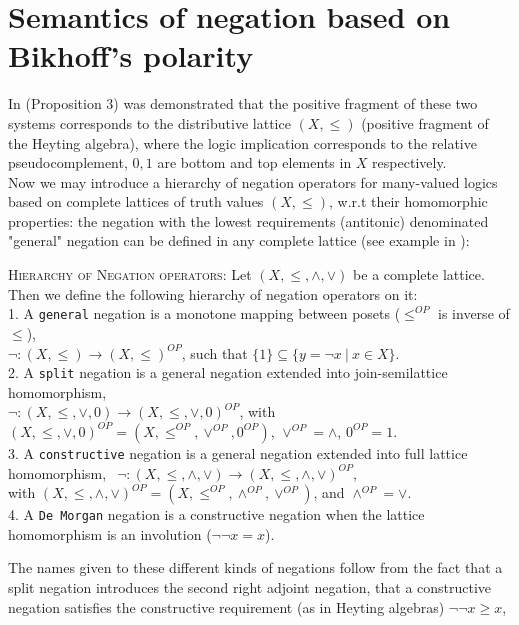 \documentclass{llncs}
\begin{document}
\section{Semantics of negation based on Bikhoff's polarity}
In \cite{Majk08dc} (Proposition 3) was demonstrated that the
positive fragment of these two systems corresponds to the
distributive lattice $(X,\leq)$ (positive fragment of the Heyting
algebra), where the logic implication corresponds to the relative
pseudocomplement, $0,1$ are bottom and top elements in $X$ respectively.\\
Now we may introduce a hierarchy of negation operators
\cite{Majk06ml} for many-valued logics based on complete lattices of
truth values $(X,\leq)$, w.r.t their homomorphic properties: the
negation with the lowest requirements (antitonic) denominated
"general" negation can be defined in any complete lattice (see
example in \cite{Majk08dc}):
\begin{definition}
\textsc{Hierarchy of Negation operators:}  \label{def:negation} Let
$(X, \leq, \wedge, \vee)$ be a complete lattice. Then we define
the following hierarchy of negation operators on it:\\
1. A \verb"general" negation is a monotone mapping between posets ($\leq^{OP}$ is inverse of $\leq$),\\
$\neg:(X,\leq) \rightarrow (X, \leq)^{OP}$, such that $\{1 \}
\subseteq \{ y = \neg x~|~ x \in X \}$.\\
2. A \verb"split" negation is a general negation extended into
join-semilattice homomorphism,\\
$\neg:(X,\leq, \vee,0) \rightarrow (X, \leq, \vee,0)^{OP}$, with
$(X, \leq, \vee,0)^{OP} = (X, \leq^{OP}, \vee^{OP},0^{OP})$,
$\vee^{OP} =
\wedge$, $0^{OP} = 1$.\\
 3. A \verb"constructive" negation is a general negation
extended into full
 lattice homomorphism,
$~~ \neg:(X,\leq, \wedge, \vee) \rightarrow (X, \leq, \wedge,
\vee)^{OP}$,\\ with $(X, \leq, \wedge, \vee)^{OP} = (X, \leq^{OP},
\wedge^{OP}, \vee^{OP}) $, and $\wedge^{OP} = \vee$.\\
4. A \verb"De Morgan" negation is a constructive negation when the
 lattice homomorphism is an involution ($\neg \neg x = x$).
 \end{definition}
 The names given to these different kinds of negations follow from
 the fact that a split negation introduces the second right adjoint
 negation, that a constructive negation satisfies the constructive
 requirement (as in Heyting algebras) $\neg \neg x \geq x$,
\end{document}
